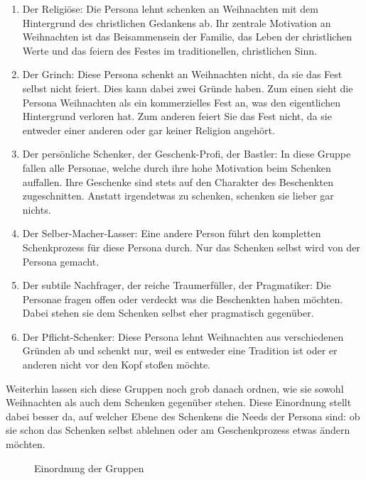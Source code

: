 \documentclass[12pt,ngerman, fleqn]{book} %
\begin{document}
\begin{enumerate}
    \item Der Religiöse: Die Persona lehnt schenken an Weihnachten mit dem Hintergrund des christlichen Gedankens ab. Ihr zentrale Motivation an Weihnachten ist das Beisammensein der Familie, das Leben der christlichen Werte und das feiern des Festes im traditionellen, christlichen Sinn.
    
    \item Der Grinch: Diese Persona schenkt an Weihnachten nicht, da sie das Fest selbst nicht feiert. Dies kann dabei zwei Gründe haben. Zum einen sieht die Persona Weihnachten als ein kommerzielles Fest an, was den eigentlichen Hintergrund verloren hat. Zum anderen feiert Sie das Fest nicht, da sie entweder einer anderen oder gar keiner Religion angehört.
    
    \item Der persönliche Schenker, der Geschenk-Profi, der Bastler: In diese Gruppe fallen alle Personae, welche durch ihre hohe Motivation beim Schenken auffallen. Ihre Geschenke sind stets auf den Charakter des Beschenkten zugeschnitten. Anstatt irgendetwas zu schenken, schenken sie lieber gar nichts.

    \item Der Selber-Macher-Lasser: Eine andere Person führt den kompletten Schenkprozess für diese Persona durch. Nur das Schenken selbst wird von der Persona gemacht.
    
    \item Der subtile Nachfrager, der reiche Traumerfüller, der Pragmatiker: Die Personae fragen offen oder verdeckt was die Beschenkten haben möchten. Dabei stehen sie dem Schenken selbst eher pragmatisch gegenüber.
    
    \item Der Pflicht-Schenker: Diese Persona lehnt Weihnachten aus verschiedenen Gründen ab und schenkt nur, weil es entweder eine Tradition ist oder er anderen nicht vor den Kopf stoßen möchte.\\
\end{enumerate}

Weiterhin lassen sich diese Gruppen noch grob danach ordnen, wie sie sowohl Weihnachten als auch dem Schenken gegenüber stehen. Diese Einordnung stellt dabei besser da, auf welcher Ebene des Schenkens die Needs der Persona sind: ob sie schon das Schenken selbst ablehnen oder am Geschenkprozess etwas ändern möchten.

\begin{figure}[ht]
    \centering
    \caption{Einordnung der Gruppen}
    \label{fig:positiv}
\end{figure}
\end{document}
